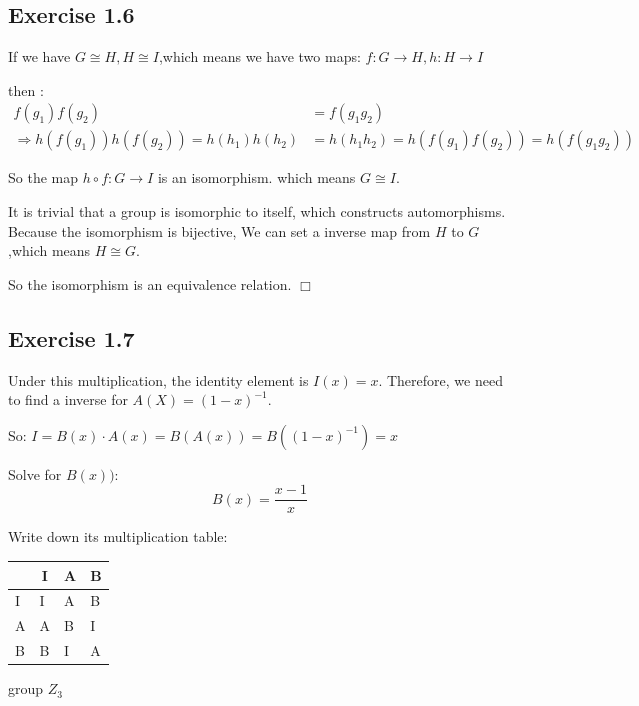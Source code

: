 \documentclass[]{ctexart}
\begin{document}
	\subsection{Exercise 1.6}
	If we have $G \cong H, H \cong I$,which means we have two maps: $f:G\rightarrow H,h:H\rightarrow I$
	
	then :
	\begin{equation*}
	\begin{aligned}
	f(g_1)f(g_2)&=f(g_1g_2)\\
	\Rightarrow h(f(g_1))h(f(g_2))=h(h_1)h(h_2)&=h(h_1h_2)=h(f(g_1)f(g_2))=h(f(g_1g_2))
	\end{aligned}
	\end{equation*}
	
	So the map $h\circ f:G\rightarrow I$ is an isomorphism. which means $G \cong I$. 
	
	It is trivial that a group is isomorphic to itself, which constructs automorphisms. 
	Because the isomorphism is bijective, We can set a inverse map from $H$ to $G$,which means $H \cong G$.
	
	So the isomorphism is an equivalence relation. $\Box$
	
	\subsection{Exercise 1.7}
	Under this multiplication, the identity element is $I(x)=x$. Therefore, we need to find a inverse for $A(X)=(1-x)^{-1}$.
	
	So: $I=B(x)\cdot A(x)=B(A(x))=B((1-x)^{-1})=x$
	
	Solve for $B(x))$:
	\begin{equation*}
		B(x)=\frac{x-1}{x}
	\end{equation*}
	
	Write down its multiplication table:
	\begin{center}
		\begin{tabular}{l|lll}
			\cline{2-4}
			\multicolumn{1}{c|}{}   & \multicolumn{1}{c|}{I} & \multicolumn{1}{c|}{A} & \multicolumn{1}{c|}{B} \\ \hline
			\multicolumn{1}{|l|}{I} & I                      & A                      & B                      \\ \cline{1-1}
			\multicolumn{1}{|l|}{A} & A                      & B                      & I                      \\ \cline{1-1}
			\multicolumn{1}{|l|}{B} & B                      & I                      & A                      \\ \cline{1-1}
		\end{tabular}
	\centerline{group $Z_3$}
	\end{center}
    
\end{document}
